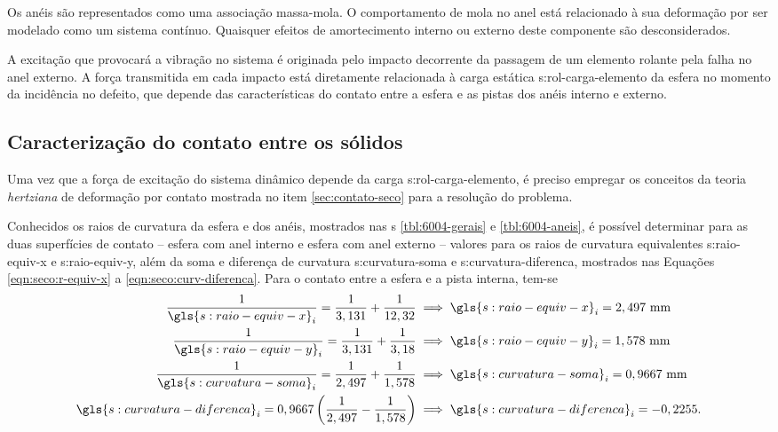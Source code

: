 \documentclass[12pt,oneside,english,brazil,lmodern,siglas,simbolos,cite=num]{ucsmonograph}
\begin{document}
	Os anéis são representados como uma associação massa-mola.
	O comportamento de mola no anel está relacionado à sua deformação por ser modelado como um sistema contínuo.
	Quaisquer efeitos de amortecimento interno ou externo deste componente são desconsiderados.
	
	A excitação que provocará a vibração no sistema é originada pelo impacto decorrente da passagem de um elemento rolante pela falha no anel externo.
	A força transmitida em cada impacto está diretamente relacionada à carga estática \gls{s:rol-carga-elemento} da esfera no momento da incidência no defeito, que depende das características do contato entre a esfera e as pistas dos anéis interno e externo.
		
	\begin{figure}[t]
		\label{fig:modelo-dinamico}
	\end{figure}
	
	\subsection{Caracterização do contato entre os sólidos}
	Uma vez que a força de excitação do sistema dinâmico depende da carga \gls{s:rol-carga-elemento}, é preciso empregar os conceitos da teoria \emph{hertziana} de deformação por contato mostrada no item \ref{sec:contato-seco} para a resolução do problema.
	
	Conhecidos os raios de curvatura da esfera e dos anéis, mostrados nas \tablename s \ref{tbl:6004-gerais} e \ref{tbl:6004-aneis}, é possível determinar para as duas superfícies de contato -- esfera com anel interno e esfera com anel externo -- valores para os raios de curvatura equivalentes \gls{s:raio-equiv-x} e \gls{s:raio-equiv-y}, além da soma e diferença de curvatura \gls{s:curvatura-soma} e \gls{s:curvatura-diferenca}, mostrados nas Equações \ref{eqn:seco:r-equiv-x} a \ref{eqn:seco:curv-diferenca}.
	Para o contato entre a esfera e a pista interna, tem-se
	\begin{align*}
		\frac{1}{\gls{s:raio-equiv-x}_i} = \frac{1}{3,131} +
		\frac{1}{12,32} &\implies \gls{s:raio-equiv-x}_i =
		2,497\ \text{mm} \\
		\frac{1}{\gls{s:raio-equiv-y}_i} = \frac{1}{3,131} +
		\frac{1}{3,18} &\implies \gls{s:raio-equiv-y}_i =
		1,578\ \text{mm} \\
		\frac{1}{\gls{s:curvatura-soma}_i} = \frac{1}{2,497} +
		\frac{1}{1,578} &\implies \gls{s:curvatura-soma}_i =
		0,9667\ \text{mm}\\
		\gls{s:curvatura-diferenca}_i = 0,9667\left( 
		\frac{1}{2,497} - \frac{1}{1,578} \right) &\implies
		\gls{s:curvatura-diferenca}_i = -0,2255.
	\end{align*}
	
\end{document}

